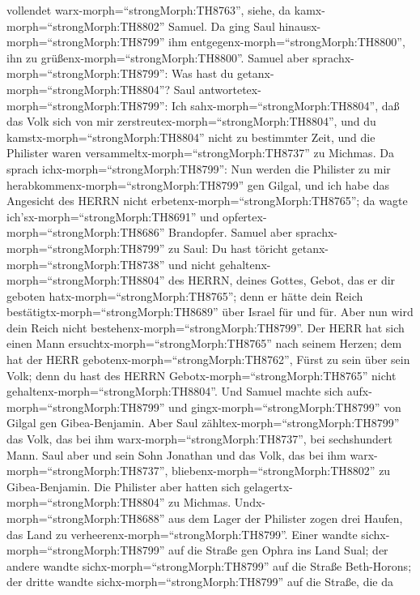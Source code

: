 vollendet warx-morph=``strongMorph:TH8763'', siehe, da
kamx-morph=``strongMorph:TH8802'' Samuel. Da ging Saul
hinausx-morph=``strongMorph:TH8799'' ihm
entgegenx-morph=``strongMorph:TH8800'', ihn zu
grüßenx-morph=``strongMorph:TH8800''.  Samuel aber
sprachx-morph=``strongMorph:TH8799'': Was hast du
getanx-morph=``strongMorph:TH8804''? Saul
antwortetex-morph=``strongMorph:TH8799'': Ich
sahx-morph=``strongMorph:TH8804'', daß das Volk sich von mir
zerstreutex-morph=``strongMorph:TH8804'', und du
kamstx-morph=``strongMorph:TH8804'' nicht zu bestimmter Zeit, und die
Philister waren versammeltx-morph=``strongMorph:TH8737'' zu Michmas.
 Da sprach ichx-morph=``strongMorph:TH8799'': Nun werden
die Philister zu mir herabkommenx-morph=``strongMorph:TH8799'' gen
Gilgal, und ich habe das Angesicht des HERRN nicht
erbetenx-morph=``strongMorph:TH8765''; da wagte
ich'sx-morph=``strongMorph:TH8691'' und
opfertex-morph=``strongMorph:TH8686'' Brandopfer.  Samuel
aber sprachx-morph=``strongMorph:TH8799'' zu Saul: Du hast töricht
getanx-morph=``strongMorph:TH8738'' und nicht
gehaltenx-morph=``strongMorph:TH8804'' des HERRN, deines Gottes, Gebot,
das er dir geboten hatx-morph=``strongMorph:TH8765''; denn er hätte dein
Reich bestätigtx-morph=``strongMorph:TH8689'' über Israel für und für.
 Aber nun wird dein Reich nicht
bestehenx-morph=``strongMorph:TH8799''. Der HERR hat sich einen Mann
ersuchtx-morph=``strongMorph:TH8765'' nach seinem Herzen; dem hat der
HERR gebotenx-morph=``strongMorph:TH8762'', Fürst zu sein über sein
Volk; denn du hast des HERRN Gebotx-morph=``strongMorph:TH8765'' nicht
gehaltenx-morph=``strongMorph:TH8804''.  Und Samuel machte
sich aufx-morph=``strongMorph:TH8799'' und
gingx-morph=``strongMorph:TH8799'' von Gilgal gen Gibea-Benjamin. Aber
Saul zähltex-morph=``strongMorph:TH8799'' das Volk, das bei ihm
warx-morph=``strongMorph:TH8737'', bei sechshundert Mann. 
Saul aber und sein Sohn Jonathan und das Volk, das bei ihm
warx-morph=``strongMorph:TH8737'', bliebenx-morph=``strongMorph:TH8802''
zu Gibea-Benjamin. Die Philister aber hatten sich
gelagertx-morph=``strongMorph:TH8804'' zu Michmas. 
Undx-morph=``strongMorph:TH8688'' aus dem Lager der Philister zogen drei
Haufen, das Land zu verheerenx-morph=``strongMorph:TH8799''. Einer
wandte sichx-morph=``strongMorph:TH8799'' auf die Straße gen Ophra ins
Land Sual;  der andere wandte
sichx-morph=``strongMorph:TH8799'' auf die Straße Beth-Horons; der
dritte wandte sichx-morph=``strongMorph:TH8799'' auf die Straße, die da
